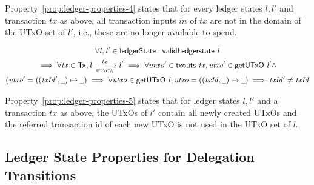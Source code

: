 Property~\ref{prop:ledger-properties-4} states that for every ledger states
$l, l'$ and transaction $tx$ as above, all transaction inputs $in$ of $tx$ are
not in the domain of the UTxO set of $l'$, i.e., these are no longer available
to spend.

\begin{property}
  \begin{multline*}
    \forall \var{l}, \var{l'} \in \ledgerState: \applyFun{validLedgerstate}{l}\\
    \implies \forall \var{tx} \in \Tx, \var{l} \trans{utxow}{tx} \var{l'}
    \implies \forall utxo' \in \applyFun{txouts}{tx}, \var{utxo'} \in
    \applyFun{getUTxO}{l'} \wedge \\(\var{utxo'} = ((\var{txId'}, \wcard) \mapsto
    \wcard) \implies \forall \var{utxo} \in \applyFun{getUTxO}{l}, \var{utxo} =
    ((\var{txId}, \wcard) \mapsto \wcard) \implies \var{txId'} \neq \var{txId}
  \end{multline*}
  \label{prop:ledger-properties-5}
\end{property}

Property~\ref{prop:ledger-properties-5} states that for ledger states $l, l'$
and a transaction $tx$ as above, the UTxOs of $l'$ contain all newly created
UTxOs and the referred transaction id of each new UTxO is not used in the UTxO
set of $l$.

\subsection{Ledger State Properties for Delegation Transitions}
\label{sec:ledg-prop-deleg}

